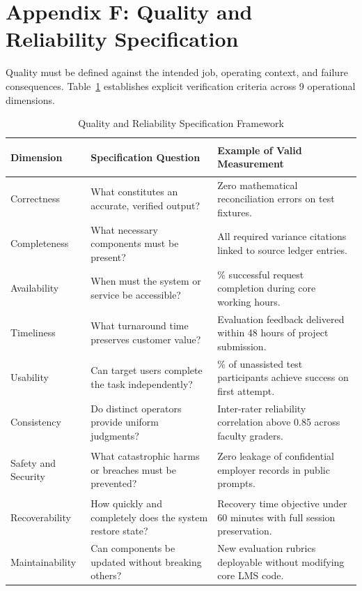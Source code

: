 \section*{Appendix F: Quality and Reliability Specification}

Quality must be defined against the intended job, operating context, and failure consequences. Table~\ref{tab:quality_reliability_spec} establishes explicit verification criteria across 9 operational dimensions.

\begin{table}[t]
\centering
\small
\caption{Quality and Reliability Specification Framework}
\label{tab:quality_reliability_spec}
\begin{tabularx}{\textwidth}{>{\bfseries\raggedright\arraybackslash}p{} >{\raggedright\arraybackslash}p{} >{\raggedright\arraybackslash}X}
\toprule
Dimension & Specification Question & Example of Valid Measurement \\
\midrule
Correctness & What constitutes an accurate, verified output? & Zero mathematical reconciliation errors on test fixtures. \\
Completeness & What necessary components must be present? & All required variance citations linked to source ledger entries. \\
Availability & When must the system or service be accessible? & 99.5\% successful request completion during core working hours. \\
Timeliness & What turnaround time preserves customer value? & Evaluation feedback delivered within 48 hours of project submission. \\
Usability & Can target users complete the task independently? & 80\% of unassisted test participants achieve success on first attempt. \\
Consistency & Do distinct operators provide uniform judgments? & Inter-rater reliability correlation above 0.85 across faculty graders. \\
Safety and Security & What catastrophic harms or breaches must be prevented? & Zero leakage of confidential employer records in public prompts. \\
Recoverability & How quickly and completely does the system restore state? & Recovery time objective under 60 minutes with full session preservation. \\
Maintainability & Can components be updated without breaking others? & New evaluation rubrics deployable without modifying core LMS code. \\
\bottomrule
\end{tabularx}
\end{table}

